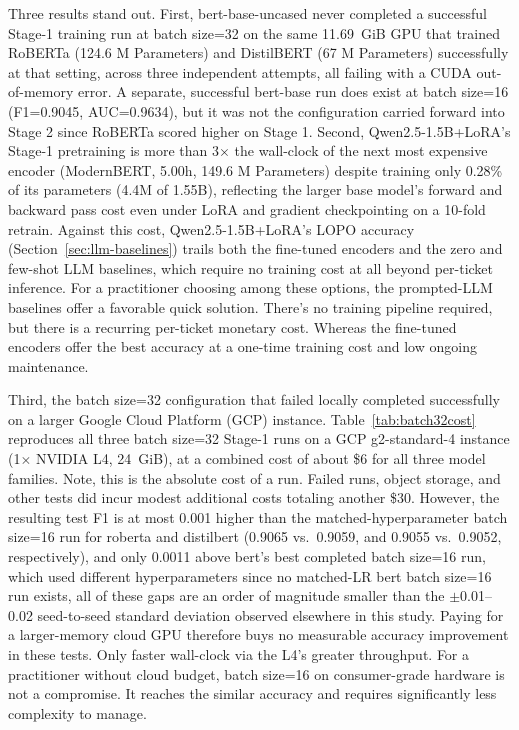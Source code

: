 \documentclass[preprint,12pt]{elsarticle}
\begin{document}
Three results stand out. First, bert-base-uncased never completed a successful Stage-1 training run at batch size=32 on the same 11.69~GiB GPU that trained RoBERTa (124.6 M Parameters) and DistilBERT (67 M Parameters) successfully at that setting, across three independent attempts, all failing with a CUDA out-of-memory error. A separate, successful bert-base run does exist at batch size=16 (F1=0.9045, AUC=0.9634), but it was not the configuration carried forward into Stage 2 since RoBERTa scored higher on Stage 1. Second, Qwen2.5-1.5B+LoRA's Stage-1 pretraining is more than 3$\times$ the wall-clock of the next most expensive encoder (ModernBERT, 5.00h, 149.6 M Parameters) despite training only 0.28\% of its parameters (4.4M of 1.55B), reflecting the larger base model's forward and backward pass cost even under LoRA and gradient checkpointing on a 10-fold retrain. Against this cost, Qwen2.5-1.5B+LoRA's LOPO accuracy (Section~\ref{sec:llm-baselines}) trails both the fine-tuned encoders and the zero and few-shot LLM baselines, which require no training cost at all beyond per-ticket inference. For a practitioner choosing among these options, the prompted-LLM baselines offer a favorable quick solution. There's no training pipeline required, but there is a recurring per-ticket monetary cost. Whereas the fine-tuned encoders offer the best accuracy at a one-time training cost and low ongoing maintenance.

Third, the batch size=32 configuration that failed locally completed successfully on a larger Google Cloud Platform (GCP) instance. Table~\ref{tab:batch32cost} reproduces all three batch size=32 Stage-1 runs on a GCP g2-standard-4 instance (1$\times$ NVIDIA L4, 24~GiB), at a combined cost of about \$6 for all three model families. Note, this is the absolute cost of a run. Failed runs, object storage, and other tests did incur modest additional costs totaling another \$30. However, the resulting test F1 is at most 0.001 higher than the matched-hyperparameter batch size=16 run for roberta and distilbert (0.9065 vs.\ 0.9059, and 0.9055 vs.\ 0.9052, respectively), and only 0.0011 above bert's best completed batch size=16 run, which used different hyperparameters since no matched-LR bert batch size=16 run exists, all of these gaps are an order of magnitude smaller than the $\pm$0.01--0.02 seed-to-seed standard deviation observed elsewhere in this study. Paying for a larger-memory cloud GPU therefore buys no measurable accuracy improvement in these tests. Only faster wall-clock via the L4's greater throughput. For a practitioner without cloud budget, batch size=16 on consumer-grade hardware is not a compromise. It reaches the similar accuracy and requires significantly less complexity to manage.
\end{document}
